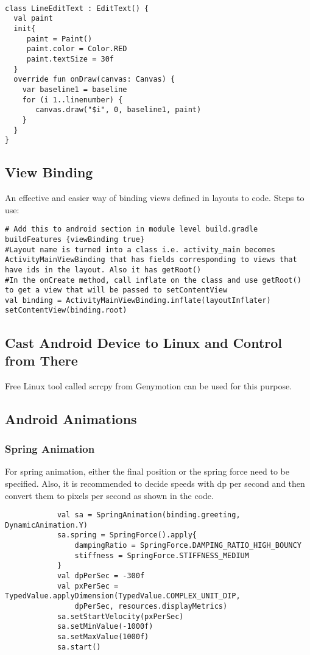 \documentclass{article}
\begin{document}
\begin{verbatim}

class LineEditText : EditText() {
  val paint 
  init{
     paint = Paint()
     paint.color = Color.RED
     paint.textSize = 30f   
  }
  override fun onDraw(canvas: Canvas) {
    var baseline1 = baseline
    for (i 1..linenumber) {
       canvas.draw("$i", 0, baseline1, paint)
    }     
  }
}

\end{verbatim}


\subsection{View Binding}
An effective and easier way of binding views defined in layouts to code. Steps to use: 
\begin{verbatim}
# Add this to android section in module level build.gradle
buildFeatures {viewBinding true}
#Layout name is turned into a class i.e. activity_main becomes ActivityMainViewBinding that has fields corresponding to views that have ids in the layout. Also it has getRoot() 
#In the onCreate method, call inflate on the class and use getRoot() to get a view that will be passed to setContentView
val binding = ActivityMainViewBinding.inflate(layoutInflater)
setContentView(binding.root)

\end{verbatim}

\subsection{Cast Android Device to Linux and Control from There}
Free Linux tool called scrcpy from Genymotion can be used for this purpose. 

\subsection{Android Animations}
\subsubsection{Spring Animation}
For spring animation, either the final position or the spring force need to be specified. 
Also, it is recommended to decide speeds with dp per second and then convert them to pixels per second as shown in the code.

\begin{lstlisting}
            val sa = SpringAnimation(binding.greeting, DynamicAnimation.Y)
            sa.spring = SpringForce().apply{
                dampingRatio = SpringForce.DAMPING_RATIO_HIGH_BOUNCY
                stiffness = SpringForce.STIFFNESS_MEDIUM
            }
            val dpPerSec = -300f
            val pxPerSec = TypedValue.applyDimension(TypedValue.COMPLEX_UNIT_DIP,
                dpPerSec, resources.displayMetrics)
            sa.setStartVelocity(pxPerSec)
            sa.setMinValue(-1000f)
            sa.setMaxValue(1000f)
            sa.start()
\end{lstlisting}
\end{document}
